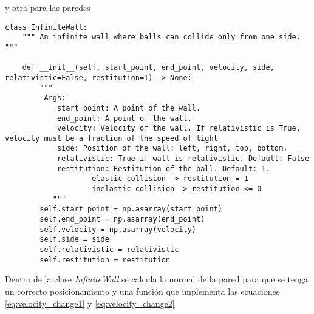 y otra para las paredes

\begin{lstlisting}[breaklines]
    class InfiniteWall:
    """ An infinite wall where balls can collide only from one side. """

    def __init__(self, start_point, end_point, velocity, side, relativistic=False, restitution=1) -> None:
        """
         Args:
            start_point: A point of the wall.
            end_point: A point of the wall.
            velocity: Velocity of the wall. If relativistic is True, velocity must be a fraction of the speed of light
            side: Position of the wall: left, right, top, bottom.
            relativistic: True if wall is relativistic. Default: False
            restitution: Restitution of the ball. Default: 1.
                    elastic collision -> restitution = 1
                    inelastic collision -> restitution <= 0
           """
        self.start_point = np.asarray(start_point)
        self.end_point = np.asarray(end_point)
        self.velocity = np.asarray(velocity)
        self.side = side
        self.relativistic = relativistic
        self.restitution = restitution
\end{lstlisting}

\vspace{3mm}

Dentro de la clase \textit{InfiniteWall} se calcula la normal de la pared para que se tenga un correcto posicionamiento y una función que implementa las ecuaciones \ref{eq:velocity_change1} y \ref{eq:velocity_change2} 

